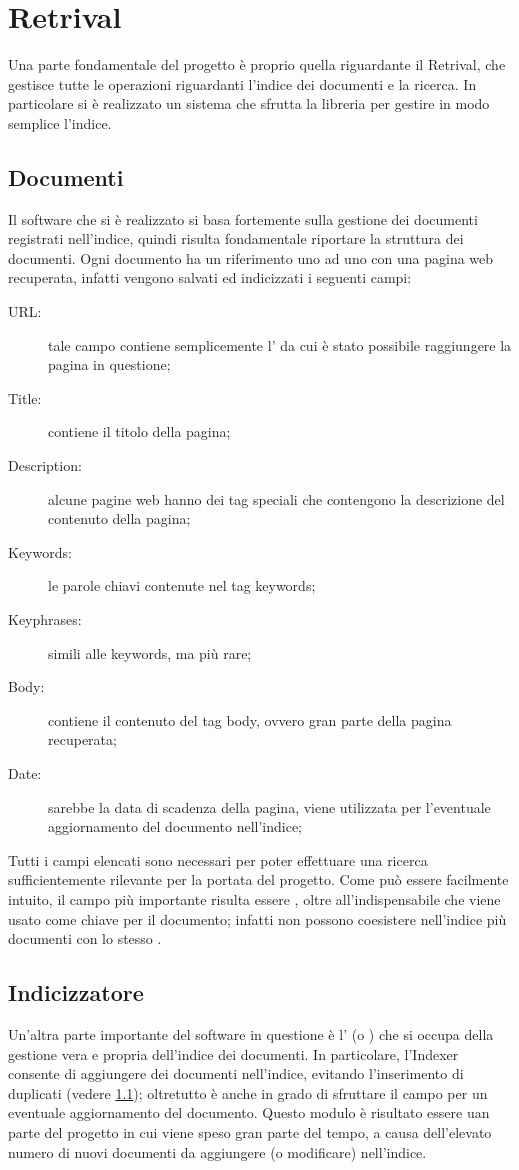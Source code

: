 \chapter{Retrival}\label{cap:retrival}
Una parte fondamentale del progetto è proprio quella riguardante il Retrival, che gestisce tutte le operazioni riguardanti l'indice dei documenti e la ricerca. In particolare si è realizzato un sistema che sfrutta la libreria  per gestire in modo semplice l'indice.
\section{Documenti}\label{cap:retrival:docs}
Il software che si è realizzato si basa fortemente sulla gestione dei documenti registrati nell'indice, quindi risulta fondamentale riportare la struttura dei documenti.
Ogni documento ha un riferimento uno ad uno con una pagina web recuperata, infatti vengono salvati ed indicizzati i seguenti campi:
\begin{description}
\item[URL:] tale campo contiene semplicemente l' da cui è stato possibile raggiungere la pagina in questione;
\item[Title:] contiene il titolo della pagina;
\item[Description:] alcune pagine web hanno dei tag speciali che contengono la descrizione del contenuto della pagina;
\item[Keywords:] le parole chiavi contenute nel tag keywords;
\item[Keyphrases:] simili alle keywords, ma più rare;
\item[Body:] contiene il contenuto del tag body, ovvero gran parte della pagina recuperata;
\item[Date:] sarebbe la data di scadenza della pagina, viene utilizzata per l'eventuale aggiornamento del documento nell'indice;
\end{description}
Tutti i campi elencati sono necessari per poter effettuare una ricerca sufficientemente rilevante per la portata del progetto. Come può essere facilmente intuito, il campo più importante risulta essere , oltre all'indispensabile  che viene usato come chiave per il documento; infatti non possono coesistere nell'indice più documenti con lo stesso .
\section{Indicizzatore}\label{cap:retrival:indexer}
Un'altra parte importante del software in questione è l' (o ) che si occupa della gestione vera e propria dell'indice dei documenti. In particolare, l'Indexer consente di aggiungere dei documenti nell'indice, evitando l'inserimento di duplicati (vedere \ref{cap:retrival:docs}); oltretutto è anche in grado di sfruttare il campo  per un eventuale aggiornamento del documento.
Questo modulo è risultato essere uan parte del progetto in cui viene speso gran parte del tempo, a causa dell'elevato numero di nuovi documenti da aggiungere (o modificare) nell'indice.

